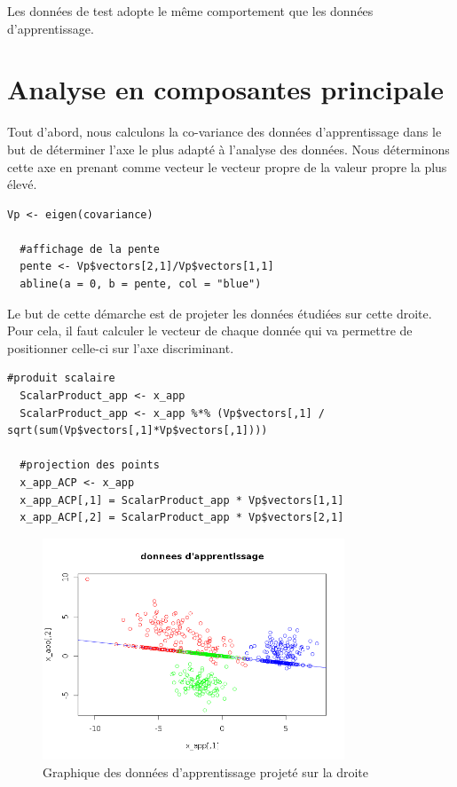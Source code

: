 \documentclass[a4paper,11pt]{article}
\begin{document}
  Les données de test adopte le même comportement que les données d'apprentissage.
  
  \section{Analyse en composantes principale}
  
  Tout d'abord, nous calculons la co-variance des données d'apprentissage dans le but de déterminer
  l'axe le plus adapté à l'analyse des données. Nous déterminons cette axe en prenant comme vecteur
  le vecteur propre de la valeur propre la plus élevé.\\
  
  \begin{lstlisting}[caption=Calcule de l'axe discriminant]
  Vp <- eigen(covariance)

  #affichage de la pente
  pente <- Vp$vectors[2,1]/Vp$vectors[1,1]
  abline(a = 0, b = pente, col = "blue")
  \end{lstlisting}

  Le but de cette démarche est de projeter les données étudiées sur cette droite. Pour cela, il
  faut calculer le vecteur de chaque donnée qui va permettre de positionner celle-ci sur l'axe 
  discriminant.\\
  
  \begin{lstlisting}[caption=Projection des données d'apprentissage sur l'axe discriminant]
  #produit scalaire
  ScalarProduct_app <- x_app
  ScalarProduct_app <- x_app %*% (Vp$vectors[,1] / sqrt(sum(Vp$vectors[,1]*Vp$vectors[,1])))

  #projection des points
  x_app_ACP <- x_app
  x_app_ACP[,1] = ScalarProduct_app * Vp$vectors[1,1]
  x_app_ACP[,2] = ScalarProduct_app * Vp$vectors[2,1]
  \end{lstlisting}
  
  \begin{figure}[H]
  \center
   \includegraphics[width=9cm]{apprentissage_acp.png}
   \caption{Graphique des données d'apprentissage projeté sur la droite}
  \end{figure}
  
\end{document}
